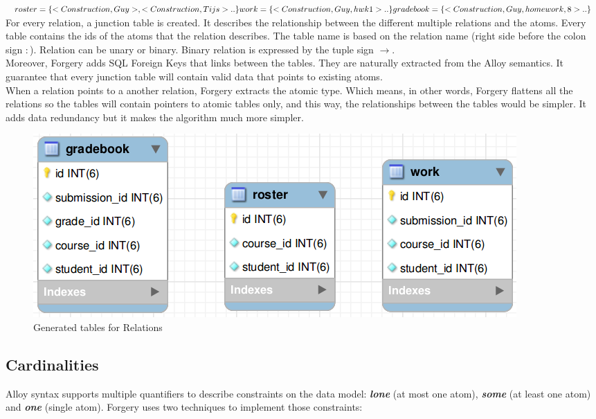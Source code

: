 \documentclass[oneside]{book}
\begin{document}
\noindent$roster = \{<Construction, Guy>, <Construction, Tijs>..\}\\
work = \{<Construction, Guy, hwk1>.. \}\\
gradebook = \{<Construction, Guy, homework, 8> ..\}$\\

\noindent For every relation, a junction table is created. It describes the relationship between the different multiple relations and the atoms.
Every table contains the ids of the atoms that the relation describes. The table name is based on the relation name (right side before the colon sign $:$). Relation can be unary or binary. Binary relation is expressed by the tuple sign $\rightarrow$.\\

\noindent Moreover, Forgery adds SQL Foreign Keys that links between the tables. They are naturally extracted from the Alloy semantics. It guarantee that every junction table will contain valid data that points to existing atoms.\\

\noindent When a relation points to a another relation, Forgery extracts the atomic type. Which means, in other words, Forgery flattens all the relations so the tables will contain pointers to atomic tables only, and this way, the relationships between the tables would be simpler. It adds data redundancy but it makes the algorithm much more simpler.

\begin{figure}[h!]
\centering
\includegraphics[scale=0.5]{2}
\caption{Generated tables for Relations}
\end{figure}

\newpage
\subsection{Cardinalities}
\noindent Alloy syntax supports multiple quantifiers to describe constraints on the data model: \textbf{\textit{lone}} (at most one atom), \textbf{\textit{some}} (at least one atom) and \textbf{\textit{one}} (single atom). Forgery uses two techniques to implement those constraints: \\
\end{document}
